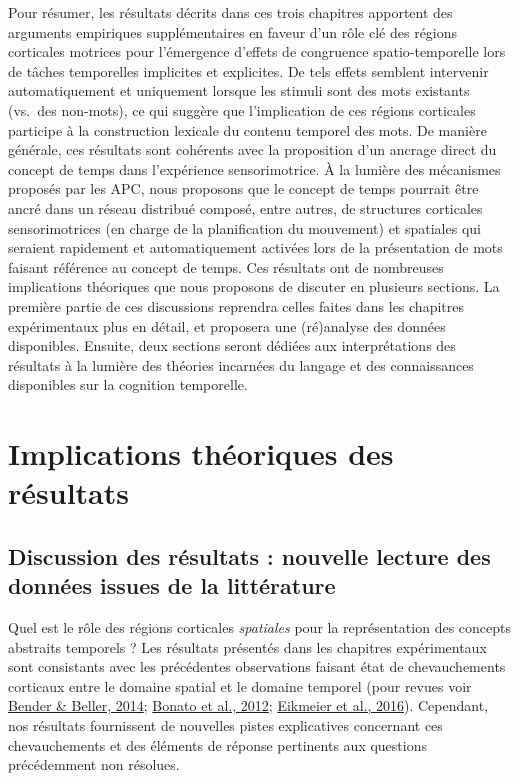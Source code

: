 \documentclass[
  a4paper,12pt,twoside,onecolumn,openright,final,oldfontcommands]{memoir}
\begin{document}
Pour résumer, les résultats décrits dans ces trois chapitres apportent des arguments empiriques supplémentaires en faveur d'un rôle clé des régions corticales motrices pour l'émergence d'effets de congruence spatio-temporelle lors de tâches temporelles implicites et explicites. De tels effets semblent intervenir automatiquement et uniquement lorsque les stimuli sont des mots existants (vs.~des non-mots), ce qui suggère que l'implication de ces régions corticales participe à la construction lexicale du contenu temporel des mots. De manière générale, ces résultats sont cohérents avec la proposition d'un ancrage direct du concept de temps dans l'expérience sensorimotrice. À la lumière des mécanismes proposés par les APC, nous proposons que le concept de temps pourrait être ancré dans un réseau distribué composé, entre autres, de structures corticales sensorimotrices (en charge de la planification du mouvement) et spatiales qui seraient rapidement et automatiquement activées lors de la présentation de mots faisant référence au concept de temps. Ces résultats ont de nombreuses implications théoriques que nous proposons de discuter en plusieurs sections. La première partie de ces discussions reprendra celles faites dans les chapitres expérimentaux plus en détail, et proposera une (ré)analyse des données disponibles. Ensuite, deux sections seront dédiées aux interprétations des résultats à la lumière des théories incarnées du langage et des connaissances disponibles sur la cognition temporelle.

\hypertarget{implications-thuxe9oriques-des-ruxe9sultats}{%
\section{Implications théoriques des résultats}\label{implications-thuxe9oriques-des-ruxe9sultats}}

\hypertarget{discussion-des-ruxe9sultats-nouvelle-lecture-des-donnuxe9es-issues-de-la-littuxe9rature}{%
\subsection{Discussion des résultats : nouvelle lecture des données issues de la littérature}\label{discussion-des-ruxe9sultats-nouvelle-lecture-des-donnuxe9es-issues-de-la-littuxe9rature}}

Quel est le rôle des régions corticales \emph{spatiales} pour la représentation des concepts abstraits temporels ? Les résultats présentés dans les chapitres expérimentaux sont consistants avec les précédentes observations faisant état de chevauchements corticaux entre le domaine spatial et le domaine temporel (pour revues voir \protect\hyperlink{ref-bender_mapping_2014}{Bender \& Beller, 2014}; \protect\hyperlink{ref-bonato_when_2012}{Bonato et al., 2012}; \protect\hyperlink{ref-lewandowska-tomaszczyk_mental_2016}{Eikmeier et al., 2016}). Cependant, nos résultats fournissent de nouvelles pistes explicatives concernant ces chevauchements et des éléments de réponse pertinents aux questions précédemment non résolues.
\end{document}

